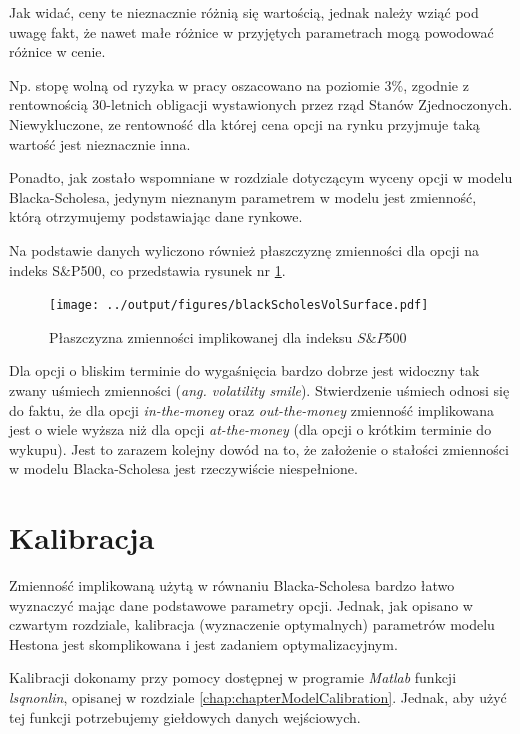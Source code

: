 \documentclass{pracamgr}
\begin{document}
Jak widać, ceny te nieznacznie różnią się wartością, jednak należy wziąć pod uwagę fakt, że nawet 
małe różnice w przyjętych parametrach mogą powodować różnice w cenie. 

Np. stopę wolną od ryzyka w pracy oszacowano na poziomie 3$\%$, zgodnie z rentownością 30-letnich 
obligacji wystawionych przez rząd Stanów Zjednoczonych. Niewykluczone, ze rentowność dla której cena 
opcji na rynku przyjmuje taką wartość jest nieznacznie inna.

Ponadto, jak zostało wspomniane w rozdziale dotyczącym wyceny opcji w modelu Blacka-Scholesa,
jedynym nieznanym parametrem w modelu jest zmienność, którą otrzymujemy podstawiając
dane rynkowe. 

Na podstawie danych wyliczono również płaszczyznę zmienności dla 
opcji na indeks S\&P500, co przedstawia rysunek nr \ref{fig:volatilitySurface}. 

\begin{figure}
  \centering
  \texttt{[image: ../output/figures/blackScholesVolSurface.pdf]}
  \caption{Płaszczyzna zmienności implikowanej dla indeksu $S\&P$500}
  \label{fig:volatilitySurface}
\end{figure}

Dla opcji o bliskim terminie do wygaśnięcia bardzo dobrze jest widoczny
tak zwany uśmiech zmienności (\textit{ang. volatility smile}). Stwierdzenie uśmiech 
odnosi się do faktu, że dla opcji \textit{in-the-money} oraz \textit{out-the-money}
zmienność implikowana jest o wiele wyższa niż dla opcji \textit{at-the-money} (dla opcji o krótkim
terminie do wykupu).
Jest to zarazem kolejny dowód na to, że założenie o stałości zmienności w modelu Blacka-Scholesa jest 
rzeczywiście niespełnione.


\section{Kalibracja}

Zmienność implikowaną użytą w równaniu Blacka-Scholesa 
bardzo łatwo wyznaczyć mając dane podstawowe parametry 
opcji. Jednak, jak opisano w czwartym rozdziale, 
kalibracja (wyznaczenie optymalnych) parametrów modelu Hestona jest skomplikowana i jest
zadaniem optymalizacyjnym.  

Kalibracji dokonamy przy pomocy dostępnej w programie \textit{Matlab} funkcji \textit{lsqnonlin}, 
opisanej w rozdziale \ref{chap:chapterModelCalibration}.
Jednak, aby użyć tej funkcji potrzebujemy giełdowych danych wejściowych.
\end{document}
